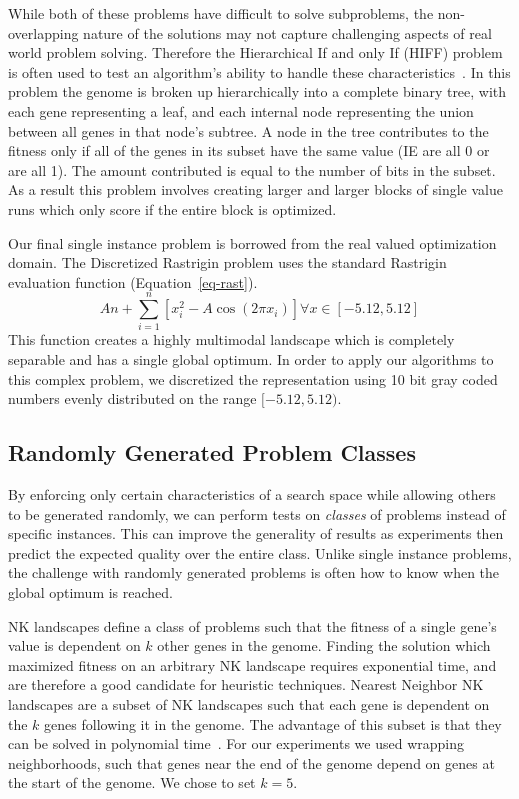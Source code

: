 \documentclass{sig-alternate}
\begin{document}
While both of these problems have difficult to solve subproblems, the non-overlapping
nature of the solutions may not capture challenging aspects of real world problem solving.
Therefore the Hierarchical If and only If (HIFF) problem is often used to test an
algorithm's ability to handle these characteristics~\cite{thierens:2013:ltgahiff}.
In this problem the genome is broken up hierarchically into a complete binary tree,
with each gene representing a leaf, and each internal node representing the union
between all genes in that node's subtree.  A node in the tree contributes to the fitness
only if all of the genes in its subset have the same value (IE are all 0 or are all 1).
The amount contributed is equal to the number of bits in the subset.  As a result
this problem involves creating larger and larger blocks of single value runs which
only score if the entire block is optimized.

Our final single instance problem is borrowed from the real valued optimization domain.
The Discretized Rastrigin problem uses the standard Rastrigin evaluation function (Equation~\ref{eq-rast}).
\begin{equation}
  An + \sum_{i=1}^{n}\left [ x_i^2-A\cos (2\pi x_i) \right ] \forall x\in [-5.12,5.12]
  \label{eq-rast}
\end{equation}
This function creates a highly multimodal landscape which is completely separable
and has a single global optimum.  In order to apply our algorithms to this complex problem,
we discretized the representation using 10 bit gray coded numbers evenly distributed
on the range $[-5.12,5.12)$.

\subsection{Randomly Generated Problem Classes}
By enforcing only certain characteristics of a search space while allowing others
to be generated randomly, we can perform tests on \emph{classes} of problems instead
of specific instances.  This can improve the generality of results as experiments
then predict the expected quality over the entire class.  Unlike single
instance problems, the challenge with randomly generated problems is often how
to know when the global optimum is reached.

NK landscapes define a class of problems such that the fitness of a single gene's
value is dependent on $k$ other genes in the genome.  Finding the solution which
maximized fitness on an arbitrary NK landscape requires exponential time, and
are therefore a good candidate for heuristic techniques.  Nearest Neighbor NK
landscapes are a subset of NK landscapes such that each gene is dependent on the $k$
genes following it in the genome.  The advantage of this subset is that they can be
solved in polynomial time~\cite{wright:2000:solvingnk}.  For our experiments we
used wrapping neighborhoods, such that genes near the end of the genome depend on
genes at the start of the genome.  We chose to set $k=5$.
\end{document}
